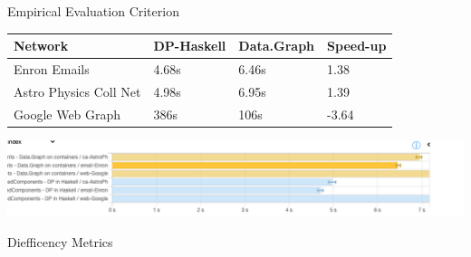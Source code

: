 \documentclass{beamer}
\begin{document}
  \begin{frame}[fragile]{Empirical Evaluation}
    Criterion

    \begin{table}[H]
      \centering
      \begin{tabular}{|l|l|l|l|}
       \hline
       \textbf{Network} & \textbf{DP-Haskell} & \textbf{Data.Graph} & \textbf{Speed-up}\\
       \hline
       Enron Emails & 4.68s &  6.46s & 1.38\\
       \hline
       Astro Physics Coll Net & 4.98s & 6.95s  & 1.39\\
       \hline
       Google Web Graph & 386s & 106s & -3.64\\
       \hline
      \end{tabular}
     \end{table}

    \begin{minipage}[t]{\linewidth}
      \includegraphics[width=\textwidth]{bench_1}
    \end{minipage}

    Diefficency Metrics


\end{frame}
\end{document}
